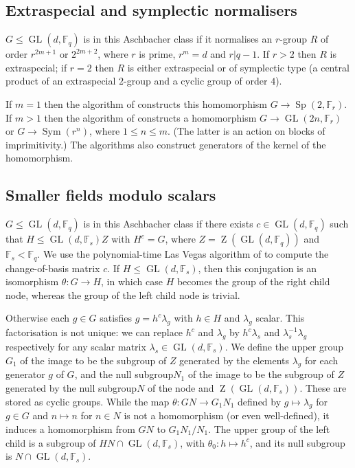\documentclass[12pt,twoside,reqno,psamsfonts]{amsproc}
\newcommand{\repgp}{{represented group}\xspace}
\newcommand{\uppergp}{{upper group}\xspace}
\newcommand{\nullsubgp}{{null subgroup}\xspace}
\numberwithin{equation}{section}
\numberwithin{figure}{section}
\newcounter{algorithm}
\theoremstyle{plain}
\theoremstyle{definition}
\theoremstyle{remark}
\providecommand{\Sym}[1]{\operatorname{Sym}( #1 )}
\newcommand{\field}[1]{\mathbb{#1}}
\newcommand{\F}{\field{F}}
\DeclareMathOperator{\GL}{GL}
\DeclareMathOperator{\Sp}{Sp}
\DeclareMathOperator{\Zent}{Z}
\begin{document}
\subsection{Extraspecial and symplectic normalisers}
\label{pgroup}
$G \leqslant \GL(d, \F_q)$ is in this Aschbacher class if it
normalises an $r$-group $R$ of order $r^{2m + 1}$ or $2^{2m + 2}$,
where $r$ is prime, $r^m = d$ and $r | q - 1$. If $r > 2$ then $R$
is extraspecial; if $r = 2$ then $R$ is either extraspecial or of
symplectic type (a central product of an extraspecial
$2$-group and a cyclic group of order $4$).

If $m = 1$ then the algorithm of \cite{MR2142090} constructs this homomorphism
$G \to \Sp(2, \F_r)$. If $m > 1$ then the algorithm of \cite{MR2257997}
constructs a homomorphism $G \to \GL(2n, \F_r)$ or $G \to \Sym{r^n}$,
where $1 \leqslant n \leqslant m$.
(The latter is an action on blocks of imprimitivity.)
The algorithms also construct generators of the kernel of the homomorphism.

\subsection{Smaller fields modulo scalars}
\label{smallerfield} 
$G \leqslant \GL(d, \F_q)$ 
is in this Aschbacher class if 
there exists $c \in \GL(d, \F_q)$ such that 
$H \leqslant \GL(d, \F_s) Z$ with $H^c=G$,
where $Z = \Zent(\GL(d, \F_q))$ and $\F_s < \F_q$.
We use the polynomial-time Las Vegas algorithm 
of \cite{smallerfield} to
compute the change-of-basis matrix $c$.
If $H \leqslant \GL(d, \F_s)$, then this conjugation
is an isomorphism $\theta:G \to H$, in which case $H$ becomes the group
of the right child node, whereas the group of the left child node is trivial.

Otherwise each $g \in G$ satisfies $g= h^c \lambda_g$
with $h \in H$ and $\lambda_g$ scalar. This factorisation is
not unique: %
we can replace $h^c$ and $\lambda_g$ by $h^c\lambda_s$ and
$\lambda_s^{-1}\lambda_g$ respectively
for any scalar matrix $\lambda_s \in \GL(d, \F_s)$. 
We define the \uppergp $G_1$ of the image to be the subgroup of $Z$
generated by the elements $\lambda_g$ for each generator
$g$ of $G$, and the \nullsubgp $N_1$ of the image to 
be the subgroup of $Z$ generated
by the \nullsubgp $N$ of the node and $\Zent(\GL(d, \F_s))$. These are
stored as cyclic groups. While the map $\theta:GN \rightarrow G_1N_1$
defined by $g \mapsto \lambda_g$ for $g \in G$ and $n \mapsto n$ for $n \in N$
is not a homomorphism (or even well-defined), it
induces a homomorphism from $GN$ to $G_1N_1/N_1$.
The \uppergp of the left child is a subgroup of
$HN \cap \GL(d, \F_s)$, with $\theta_0: h \mapsto h^c$,
and its \nullsubgp is $N \cap \GL(d, \F_s)$. 
\end{document}
